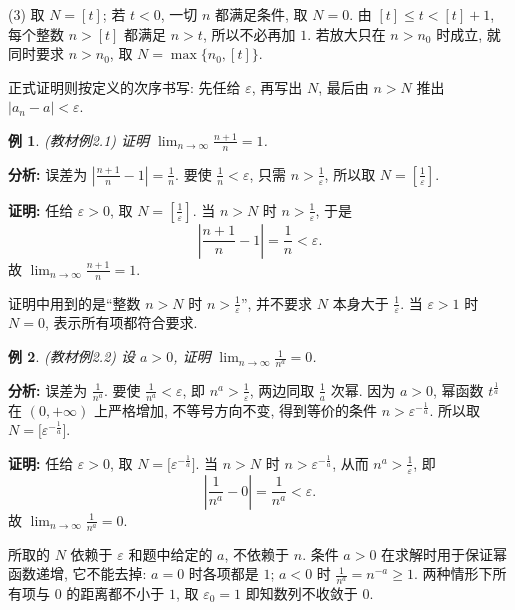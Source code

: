 \documentclass[UTF8,openany]{ctexbook}
\theoremstyle{chinesetextbook}
\newtheorem{example}{例}[section]
\newenvironment{cnproof}{\par\indent\textbf{证明:} \ignorespaces}{\par}
\begin{document}
(3) 取 $N=[t]$; 若 $t<0$, 一切 $n$ 都满足条件, 取 $N=0$. 由 $[t]\le t<[t]+1$, 每个整数 $n>[t]$ 都满足 $n>t$, 所以不必再加 $1$. 若放大只在 $n>n_0$ 时成立, 就同时要求 $n>n_0$, 取 $N=\max\{n_0,[t]\}$.

正式证明则按定义的次序书写: 先任给 $\varepsilon$, 再写出 $N$, 最后由 $n>N$ 推出 $|a_n-a|<\varepsilon$.
\begin{example}
\textnormal{(教材例2.1)} 证明 $\displaystyle\lim_{n\to\infty}\frac{n+1}n=1$.
\end{example}
\par\indent\textbf{分析:} 误差为 $\displaystyle\left|\frac{n+1}n-1\right|=\frac1n$. 要使 $\displaystyle\frac1n<\varepsilon$, 只需 $\displaystyle n>\frac1\varepsilon$, 所以取 $\displaystyle N=\left[\frac1\varepsilon\right]$.
\begin{cnproof}
任给 $\varepsilon>0$, 取 $\displaystyle N=\left[\frac1\varepsilon\right]$. 当 $n>N$ 时 $\displaystyle n>\frac1\varepsilon$, 于是
\[
\left|\frac{n+1}n-1\right|=\frac1n<\varepsilon.
\]
故 $\displaystyle\lim_{n\to\infty}\frac{n+1}n=1$.
\end{cnproof}
证明中用到的是“整数 $n>N$ 时 $\displaystyle n>\frac1\varepsilon$”, 并不要求 $N$ 本身大于 $\displaystyle\frac1\varepsilon$. 当 $\varepsilon>1$ 时 $N=0$, 表示所有项都符合要求.
\begin{example}
\textnormal{(教材例2.2)} 设 $a>0$, 证明 $\displaystyle\lim_{n\to\infty}\frac1{n^a}=0$.
\end{example}
\par\indent\textbf{分析:} 误差为 $\displaystyle\frac1{n^a}$. 要使 $\displaystyle\frac1{n^a}<\varepsilon$, 即 $\displaystyle n^a>\frac1\varepsilon$, 两边同取 $\displaystyle\frac1a$ 次幂. 因为 $a>0$, 幂函数 $t^{\frac1a}$ 在 $(0,+\infty)$ 上严格增加, 不等号方向不变, 得到等价的条件 $n>\varepsilon^{-\frac1a}$. 所以取 $N=\bigl[\varepsilon^{-\frac1a}\bigr]$.
\begin{cnproof}
任给 $\varepsilon>0$, 取 $N=\bigl[\varepsilon^{-\frac1a}\bigr]$. 当 $n>N$ 时 $n>\varepsilon^{-\frac1a}$, 从而 $\displaystyle n^a>\frac1\varepsilon$, 即
\[
\left|\frac1{n^a}-0\right|=\frac1{n^a}<\varepsilon.
\]
故 $\displaystyle\lim_{n\to\infty}\frac1{n^a}=0$.
\end{cnproof}
所取的 $N$ 依赖于 $\varepsilon$ 和题中给定的 $a$, 不依赖于 $n$. 条件 $a>0$ 在求解时用于保证幂函数递增, 它不能去掉: $a=0$ 时各项都是 $1$; $a<0$ 时 $\displaystyle\frac1{n^a}=n^{-a}\ge1$. 两种情形下所有项与 $0$ 的距离都不小于 $1$, 取 $\varepsilon_0=1$ 即知数列不收敛于 $0$.
\end{document}
